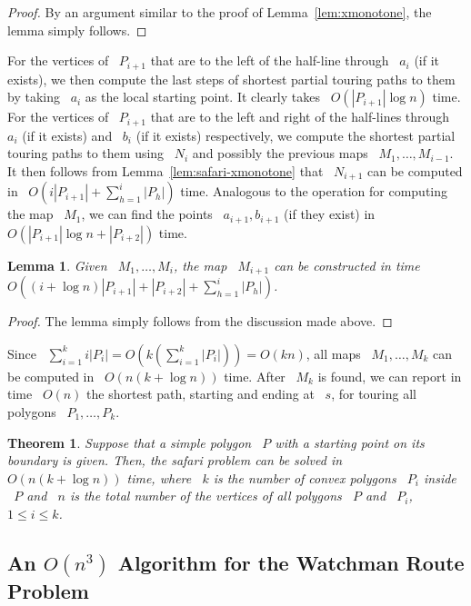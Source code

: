 \documentclass[11pt]{article}
\newtheorem{theorem}{Theorem}
\newtheorem{lemma}{Lemma}
\begin{document}
\begin{proof}
By an argument similar to the proof of Lemma~\ref{lem:xmonotone}, the lemma simply follows.
\end{proof}

For the vertices of ~\(P_{i+1}\) that are to the left of the half-line through ~\(a_i\) (if it exists), we then compute the last steps of shortest partial touring paths to them by taking ~\(a_i\) as the local starting point.
It clearly takes ~\(O(|P_{i+1}|\log n)\) time.
For the vertices of ~\(P_{i+1}\) that are to the left and right of the half-lines through ~\(a_i\) (if it exists) and ~\(b_i\) (if it exists) respectively, we compute the shortest partial touring paths to them using ~\(N_i\) and possibly the previous maps ~\(M_1, \ldots, M_{i-1}\).
It then follows from Lemma~\ref{lem:safari-xmonotone} that ~\(N_{i+1}\) can be computed in ~\(O\!\left(i|P_{i+1}| + \sum_{h=1}^i |P_h|\right)\) time.
Analogous to the operation for computing the map ~\(M_1\), we can find the points ~\(a_{i+1}, b_{i+1}\) (if they exist) in ~\(O(|P_{i+1}|\log n + |P_{i+2}|)\) time.

\begin{lemma}
\label{lem:safari-Mi1}
Given ~\(M_1, \ldots, M_i\), the map ~\(M_{i+1}\) can be constructed in time ~\(O\!\left((i + \log n)|P_{i+1}| + |P_{i+2}| + \sum_{h=1}^i |P_h|\right)\).
\end{lemma}

\begin{proof}
The lemma simply follows from the discussion made above.
\end{proof}

Since ~\(\sum_{i=1}^k i|P_i| = O\!\left(k\left(\sum_{i=1}^k |P_i|\right)\right) = O(kn)\), all maps ~\(M_1, \ldots, M_k\) can be computed in ~\(O(n(k+\log n))\) time.
After ~\(M_k\) is found, we can report in time ~\(O(n)\) the shortest path, starting and ending at ~\(s\), for touring all polygons ~\(P_1, \ldots, P_k\).

\begin{theorem}
\label{thm:safari}
Suppose that a simple polygon ~\(P\) with a starting point on its boundary is given. Then, the safari problem can be solved in ~\(O(n(k+\log n))\) time, where ~\(k\) is the number of convex polygons ~\(P_i\) inside ~\(P\) and ~\(n\) is the total number of the vertices of all polygons ~\(P\) and ~\(P_i\), ~\(1 \le i \le k\).
\end{theorem}

\subsection{An \(O(n^3)\) Algorithm for the Watchman Route Problem}
\end{document}
